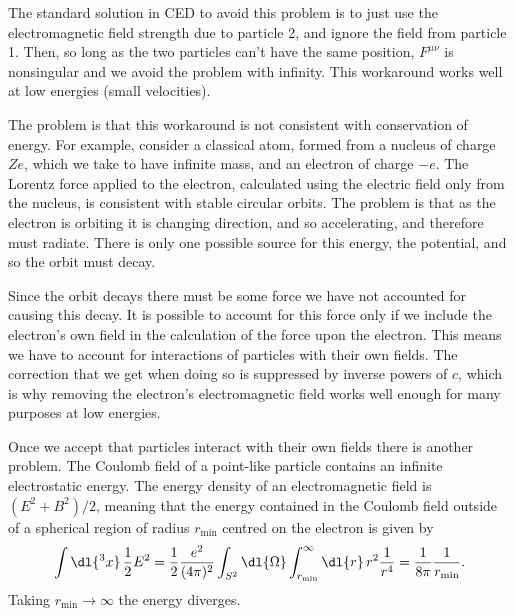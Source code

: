 \documentclass[fleqn]{NotesClass}
\begin{document}
    The standard solution in CED to avoid this problem is to just use the electromagnetic field strength due to particle 2, and ignore the field from particle 1.
    Then, so long as the two particles can't have the same position, \(F^{\mu\nu}\) is nonsingular and we avoid the problem with infinity.
    This workaround works well at low energies (small velocities).
    
    The problem is that this workaround is not consistent with conservation of energy.
    For example, consider a classical atom, formed from a nucleus of charge \(Ze\), which we take to have infinite mass, and an electron of charge \(-e\).
    The Lorentz force applied to the electron, calculated using the electric field only from the nucleus, is consistent with stable circular orbits.
    The problem is that as the electron is orbiting it is changing direction, and so accelerating, and therefore must radiate.
    There is only one possible source for this energy, the potential, and so the orbit must decay.
    
    Since the orbit decays there must be some force we have not accounted for causing this decay.
    It is possible to account for this force only if we include the electron's own field in the calculation of the force upon the electron.
    This means we have to account for interactions of particles with their own fields.
    The correction that we get when doing so is suppressed by inverse powers of \(c\), which is why removing the electron's electromagnetic field works well enough for many purposes at low energies.
    
    Once we accept that particles interact with their own fields there is another problem.
    The Coulomb field of a point-like particle contains an infinite electrostatic energy.
    The energy density of an electromagnetic field is \((E^2 + B^2)/2\), meaning that the energy contained in the Coulomb field outside of a spherical region of radius \(r_{\min}\) centred on the electron is given by
    \begin{equation}
        \int \dl{^3x} \, \frac{1}{2}E^2 = \frac{1}{2}\frac{e^2}{(4\pi)^2} \int_{S^2} \dl{\Omega} \int_{r_{\min}}^{\infty} \dl{r} \, r^2 \frac{1}{r^4} = \frac{1}{8\pi} \frac{1}{r_{\min}}.
    \end{equation}
    Taking \(r_{\min} \to \infty\) the energy diverges.
    
\end{document}

